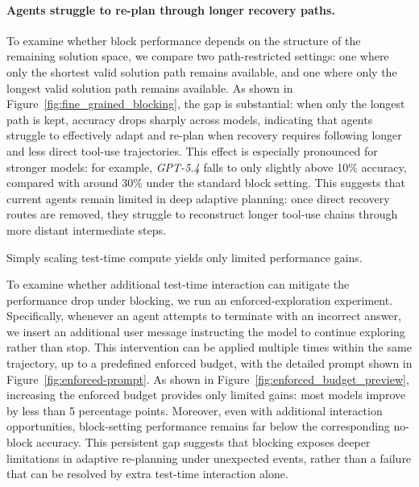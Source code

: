 \paragraph{Agents struggle to re-plan through longer recovery paths.}
To examine whether block performance depends on the structure of the remaining solution space, we compare two path-restricted settings: one where only the shortest valid solution path remains available, and one where only the longest valid solution path remains available. 
As shown in Figure~\ref{fig:fine_grained_blocking}, the gap is substantial: when only the longest path is kept, accuracy drops sharply across models, indicating that agents struggle to effectively adapt and re-plan when recovery requires following longer and less direct tool-use trajectories. 
This effect is especially pronounced for stronger models: for example, \textit{GPT-5.4} falls to only slightly above 10\% accuracy, compared with around 30\% under the standard block setting. 
This suggests that current agents remain limited in deep adaptive planning: once direct recovery routes are removed, they struggle to reconstruct longer tool-use chains through more distant intermediate steps.




\begin{takeaway}[label={tak:analysis-test-time-tricks}]
Simply scaling test-time compute yields only limited performance gains.
\label{sec:enforce-analysis}
\end{takeaway}

\noindent To examine whether additional test-time interaction can mitigate the performance drop under blocking, we run an enforced-exploration experiment.
Specifically, whenever an agent attempts to terminate with an incorrect answer, we insert an additional user message instructing the model to continue exploring rather than stop.
This intervention can be applied multiple times within the same trajectory, up to a predefined enforced budget, with the detailed prompt shown in Figure~\ref{fig:enforced-prompt}.
As shown in Figure~\ref{fig:enforced_budget_preview}, increasing the enforced budget provides only limited gains: most models improve by less than 5 percentage points.
Moreover, even with additional interaction opportunities, block-setting performance remains far below the corresponding no-block accuracy.
This persistent gap suggests that blocking exposes deeper limitations in adaptive re-planning under unexpected events, rather than a failure that can be resolved by extra test-time interaction alone.

